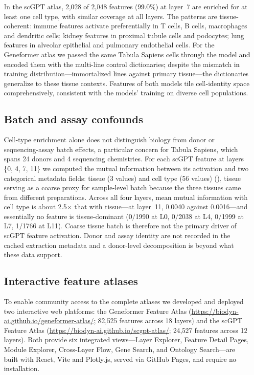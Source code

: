 In the scGPT atlas, 2,028 of 2,048 features (99.0\%) at layer~7 are enriched for at least one cell
type, with similar coverage at all layers. The patterns are tissue-coherent: immune features
activate preferentially in T cells, B cells, macrophages and dendritic cells; kidney features in
proximal tubule cells and podocytes; lung features in alveolar epithelial and pulmonary endothelial
cells. For the Geneformer atlas we passed the same Tabula Sapiens cells through the model and
encoded them with the multi-line control dictionaries; despite the mismatch in training
distribution---immortalized lines against primary tissue---the dictionaries generalize to these
tissue contexts. Features of both models tile cell-identity space
comprehensively, consistent with the models' training on diverse cell populations.

\subsection*{Batch and assay confounds}
\label{sec:batch}

Cell-type enrichment alone does not distinguish biology from donor or sequencing-assay batch
effects, a particular concern for Tabula Sapiens, which spans 24 donors and 4 sequencing
chemistries. For each scGPT feature at layers \{0, 4, 7, 11\} we computed the mutual information
between its activation and two categorical metadata fields: tissue (3 values) and cell type (56 values)
(), tissue serving as a coarse proxy for sample-level batch because the three tissues came
from different preparations. Across all four layers, mean mutual information with cell type is
about 2.5$\times$ that with tissue---at layer~11, 0.0040 against 0.0016---and essentially no
feature is tissue-dominant (0/1990 at L0, 0/2038 at L4, 0/1999 at L7, 1/1766 at L11). Coarse tissue
batch is therefore not the primary driver of scGPT feature activation. Donor and assay identity are
not recorded in the cached extraction metadata and a donor-level decomposition is beyond what these
data support.

\subsection*{Interactive feature atlases}
\label{sec:atlases}

To enable community access to the complete atlases we developed and deployed two interactive web
platforms: the Geneformer Feature Atlas
(\url{https://biodyn-ai.github.io/geneformer-atlas/}; 82,525 features across 18 layers) and the
scGPT Feature Atlas (\url{https://biodyn-ai.github.io/scgpt-atlas/}; 24,527 features across 12
layers). Both provide six integrated views---Layer Explorer, Feature Detail Pages, Module Explorer,
Cross-Layer Flow, Gene Search, and Ontology Search---are built with React, Vite and Plotly.js,
served via GitHub Pages, and require no installation.
